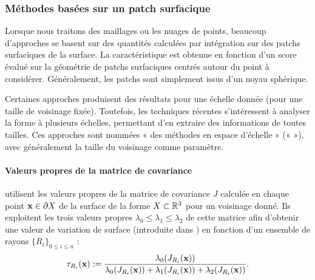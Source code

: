 \subsubsection{Méthodes basées sur un patch surfacique}%
\label{sec:applications:feature:patch}
%
Lorsque nous traitons des maillages ou les nuages de points, beaucoup
d'approches se basent sur des quantités calculées par intégration sur des patchs
surfaciques de la surface. La caractéristique est obtenue en fonction d'un score
évalué sur la géométrie de patchs surfaciques centrés autour du point à
considérer. Généralement, les patchs sont simplement issus d'un noyau sphérique.


Certaines approches produisent des résultats pour une échelle donnée (pour une
taille de voisinage fixée). Toutefois, les techniques récentes s'intéressent à
analyser la forme à plusieurs échelles, permettant d'en extraire des
informations de toutes tailles. Ces approches sont nommées « des méthodes en
espace d'échelle » \cite{Witkin1983} («  »), avec
généralement la taille du voisinage comme paramètre.
%
\paragraph{Valeurs propres de la matrice de covariance}
%
 utilisent les valeurs propres de la matrice de
covariance $J$ calculée en chaque point $\mathbf{x} \in \partial X$ de la surface de la forme
$X \subset \mathbb{R}^3$ pour un voisinage donné. Ils exploitent les trois valeurs
propres $\lambda_0 \leq \lambda_1 \leq \lambda_2$ de cette matrice afin
d'obtenir une valeur de variation de surface (introduite dans \cite{Pauly2002})
en fonction d'un ensemble de rayons $\{ R_i \}_{0 \le i \le n}$ :
%
\begin{equation}
  \tau_{R_i}(\mathbf{x}) := \frac{\lambda_0(J_{R_i}(\mathbf{x}))}{\lambda_0(J_{R_i}(\mathbf{x})) + \lambda_1(J_{R_i}(\mathbf{x})) + \lambda_2(J_{R_i}(\mathbf{x}))}.
\end{equation}

